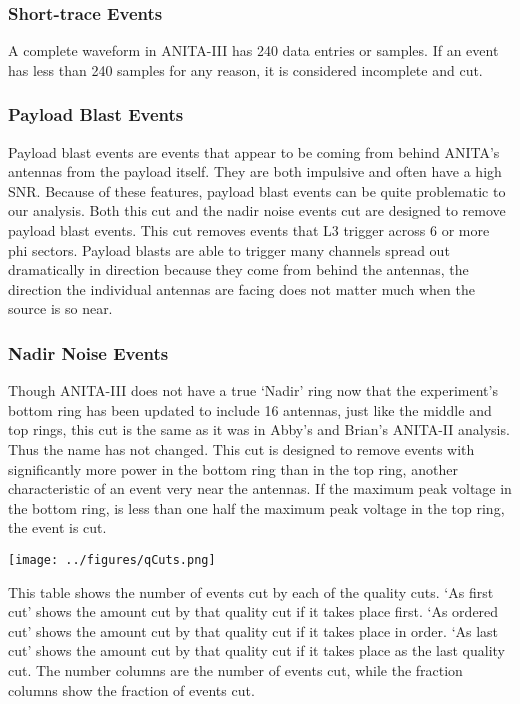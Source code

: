\subsubsection{Short-trace Events}

A complete waveform in ANITA-III has 240 data entries or samples.  If an event has less than 240 samples for any reason, it is considered incomplete and cut.

\subsubsection{Payload Blast Events}

Payload blast events are events that appear to be coming from behind ANITA's antennas from the payload itself.  They are both impulsive and often have a high SNR. Because of these features, payload blast events can be quite problematic to our analysis.  Both this cut and the nadir noise events cut are designed to remove payload blast events.  This cut removes events that L3 trigger across 6 or more phi sectors.  Payload blasts are able to trigger many channels spread out dramatically in direction because they come from behind the antennas, the direction the individual antennas are facing does not matter much when the source is so near.

\subsubsection{Nadir Noise Events}

Though ANITA-III does not have a true `Nadir' ring now that the experiment's bottom ring has been updated to include 16 antennas, just like the middle and top rings, this cut is the same as it was in Abby's and Brian's ANITA-II analysis.  Thus the name has not changed.  This cut is designed to remove events with significantly more power in the bottom ring than in the top ring, another characteristic of an event very near the antennas.  If the maximum peak voltage in the bottom ring, is less than one half the maximum peak voltage in the top ring, the event is cut.

\begin{table}[h]
\centering
\texttt{[image: ../figures/qCuts.png]}
\caption[Quality Cuts Table]{This table shows the number of events cut by each of the quality cuts.  `As first cut' shows the amount cut by that quality cut if it takes place first.  `As ordered cut' shows the amount cut by that quality cut if it takes place in order.  `As last cut' shows the amount cut by that quality cut if it takes place as the last quality cut.  The number columns are the number of events cut, while the fraction columns show the fraction of events cut.}
\label{tab:qcuts}
\end{table}

